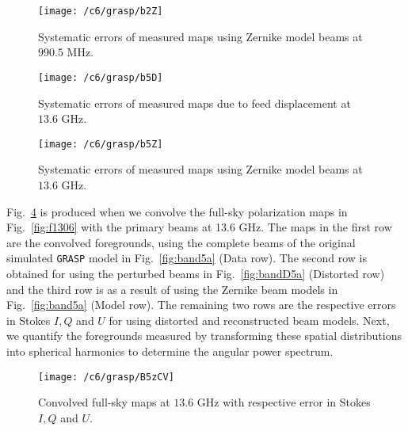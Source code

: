 \begin{figure}
\begin{minipage}[H]{\linewidth}
\centering
\texttt{[image: /c6/grasp/b2Z]} %
\caption{\label{fig:erZ2} Systematic errors of measured maps using Zernike model beams at $990.5$ MHz.}
\end{minipage}
\end{figure}
\FloatBarrier


\begin{figure}
\begin{minipage}[H]{\linewidth}
\centering
\texttt{[image: /c6/grasp/b5D]} %
\caption{\label{fig:erD} Systematic errors of measured maps due to feed displacement at $13.6$ GHz.}
\end{minipage}
\end{figure}
\FloatBarrier

\begin{figure}
\begin{minipage}[H]{\linewidth}
\centering
\texttt{[image: /c6/grasp/b5Z]} %
\caption{\label{fig:erZ} Systematic errors of measured maps using Zernike model beams at $13.6$ GHz.}
\end{minipage}
\end{figure}
\FloatBarrier


\noindent Fig.~\ref{fig:b5ALL} is produced when we convolve the full-sky polarization maps in Fig.~\ref{fig:f1306} with the primary beams at 13.6 GHz. 
The maps in the first row are the convolved foregrounds, using the complete beams of the original simulated {\tt GRASP} model in Fig.~\ref{fig:band5a} (Data row). 
The second row is obtained for using the perturbed beams in Fig.~\ref{fig:bandD5a} (Distorted row) and the third row is as a result of using the Zernike beam models 
in Fig.~\ref{fig:band5a} (Model row). The remaining two rows are the respective errors in Stokes $I, Q$ and $U$ for using distorted
and reconstructed beam models. Next, we quantify the foregrounds measured by transforming these spatial distributions into spherical harmonics to determine the angular power
spectrum.


\begin{figure}
\begin{minipage}[H]{\linewidth}
\centering
\texttt{[image: /c6/grasp/B5zCV]} %
\caption{\label{fig:b5ALL} Convolved full-sky maps at $13.6$ GHz  with respective error in Stokes $I, Q$ and $U$.}
\end{minipage}
\end{figure}
\FloatBarrier
% 

